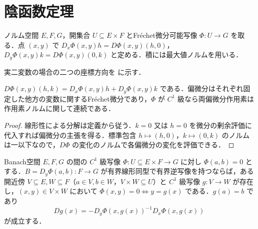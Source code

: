 \section{陰函数定理}
\begin{defn}[偏微分作用素]
ノルム空間 $E,F,G$，開集合 $U\subseteq E\times F$ とFréchet微分可能写像 $\Phi:U\to G$ を取る．点 $(x,y)$ で $D_x\Phi(x,y)h=D\Phi(x,y)(h,0)$，$D_y\Phi(x,y)k=D\Phi(x,y)(0,k)$ と定める．積には最大値ノルムを用いる．
\end{defn}
実二変数の場合の二つの座標方向を  に示す．
\begin{prop}[全微分の偏微分への分解]
$D\Phi(x,y)(h,k)=D_x\Phi(x,y)h+D_y\Phi(x,y)k$ である．偏微分はそれぞれ固定した他方の変数に関するFréchet微分であり，$\Phi$ が $C^1$ 級なら両偏微分作用素は作用素ノルムに関して連続である．
\end{prop}
\begin{proof}
線形性による分解は定義から従う．$k=0$ 又は $h=0$ を微分の剰余評価に代入すれば偏微分の主張を得る．標準包含 $h\mapsto(h,0)$，$k\mapsto(0,k)$ のノルムは一以下なので，$D\Phi$ の変化のノルムで各偏微分の変化を評価できる．
\end{proof}
\begin{prop}[Banach空間の陰函数定理]
Banach空間 $E,F,G$ の間の $C^1$ 級写像 $\Phi:U\subseteq E\times F\to G$ に対し $\Phi(a,b)=0$ とする．$B=D_y\Phi(a,b):F\to G$ が有界線形同型で有界逆写像を持つならば，ある開近傍 $V\subseteq E,W\subseteq F$（$a\in V,b\in W$，$V\times W\subseteq U$）と $C^1$ 級写像 $g:V\to W$ が存在し，$(x,y)\in V\times W$ において $\Phi(x,y)=0\Leftrightarrow y=g(x)$ である．$g(a)=b$ であり
\[
Dg(x)=-D_y\Phi(x,g(x))^{-1}D_x\Phi(x,g(x))
\]
が成立する．
\end{prop}
